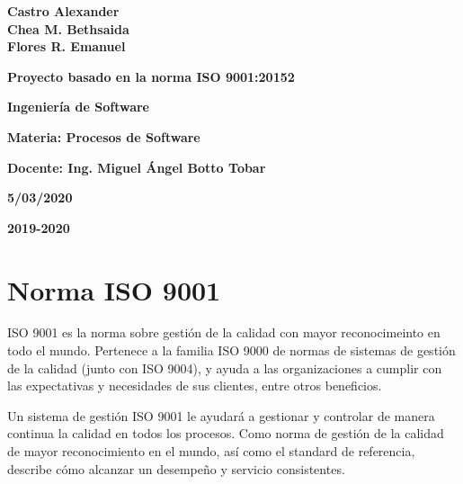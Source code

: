 \documentclass[12pt,a4paper]{article}
\begin{document}
{\begin{center}
{\par\vspace{0.2cm}
\Large\textbf{Castro Alexander}\\
\Large\textbf{Chea M. Bethsaida} \\
\Large\textbf{Flores R. Emanuel}\\
\par\vspace{0.5cm}
\Large\textbf{Proyecto basado en la norma ISO 9001:20152}
\par\vspace{1cm}
\Large\textbf{Ingenier\'ia de Software}
\par\vspace{1cm}
\Large\textbf{Materia: Procesos de Software}
\par\vspace{1cm}
\Large\textbf{Docente: Ing. Miguel \'Angel Botto Tobar }
}
\par\vspace{2cm}
\large\textbf{ 5/03/2020}
\par\vspace{0.5cm}
\large\textbf{2019-2020} 
\par\vspace{3cm} 

\end{center}
\clearpage
}

\tableofcontents
\par\vspace{16cm}

\section{Norma ISO 9001}\textbf{}

ISO 9001 es la norma sobre gestión de la calidad con mayor reconocimeinto en todo el mundo. Pertenece a la familia ISO 9000 de normas de sistemas de gestión de la calidad (junto con ISO 9004), y ayuda a las organizaciones a cumplir con las expectativas y necesidades de sus clientes, entre otros beneficios.

Un sistema de gestión ISO 9001 le ayudará a gestionar y controlar de manera continua la calidad en todos los procesos. Como norma de gestión de la calidad de mayor reconocimiento en el mundo, así como el standard de referencia, describe cómo alcanzar un desempeño y servicio consistentes.
\end{document}

